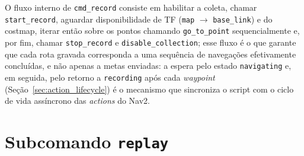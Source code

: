 O fluxo interno de \texttt{cmd\_\allowbreak record} consiste em habilitar a coleta, chamar
\texttt{start\_\allowbreak record}, aguardar disponibilidade de TF (\texttt{map} $\to$
\texttt{base\_\allowbreak link}) e do costmap, iterar então sobre os pontos chamando
\texttt{go\_\allowbreak to\_\allowbreak point} sequencialmente e, por fim, chamar
\texttt{stop\_\allowbreak record} e \texttt{disable\_\allowbreak collection}; esse fluxo é o que garante que
cada rota gravada corresponda a uma sequência de navegações efetivamente
concluídas, e não apenas a metas enviadas: a espera pelo estado
\texttt{navigating} e, em seguida, pelo retorno a \texttt{recording} após cada
\textit{waypoint} (Seção~\ref{sec:action_lifecycle}) é o mecanismo que
sincroniza o script com o ciclo de vida assíncrono das \textit{actions} do Nav2.

\section{Subcomando \texttt{replay}}

